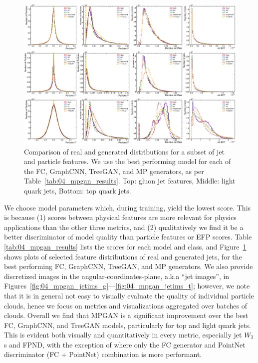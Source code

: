 \begin{figure}[htpb]
    \centering
    \centerline{\includegraphics[width=\textwidth]{figures/04-ML4Sim/mpgan/results/feature_distributions.pdf}}
    \caption[Comparison of real and generated distributions for a subset of jet and particle features.]{Comparison of real and generated distributions for a subset of jet and particle features. We use the best performing model for each of the FC, GraphCNN, TreeGAN, and MP generators, as per Table~\ref{tab:04_mpgan_results}. Top: gluon jet features, Middle: light quark jets, Bottom: top quark jets.
    }
    \label{fig:04_mpgan_results}
\end{figure}

We choose model parameters which, during training, yield the lowest \wassm score.
This is because (1) \wass scores between physical features are more relevant for physics applications than the other three metrics, and (2) qualitatively we find it be a better discriminator of model quality than particle features or EFP scores. 
Table \ref{tab:04_mpgan_results} lists the scores for each model and class, and Figure~\ref{fig:04_mpgan_results} shows plots of selected feature distributions of real and generated jets, for the best performing FC, GraphCNN, TreeGAN, and MP generators.
We also provide discretized images in the angular-coordinates-plane, a.k.a ``jet images'', in Figures~\ref{fig:04_mpgan_jetims_g}---\ref{fig:04_mpgan_jetims_t}; however, we note that it is in general not easy to visually evaluate the quality of individual particle clouds, hence we focus on metrics and visualizations aggregated over batches of clouds.
Overall we find that MPGAN is a significant improvement over the best FC, GraphCNN, and TreeGAN models, particularly for top and light quark jets.
This is evident both visually and quantitatively in every metric, especially jet $W_1$s and FPND, with the exception of \wassp where only the FC generator and PointNet discriminator (FC + PointNet) combination is more performant. 

